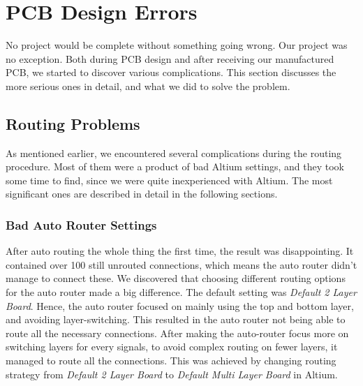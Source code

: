 \section{PCB Design Errors}
No project would be complete without something going wrong. Our project was no exception. Both during PCB design and after receiving our manufactured PCB, we started to discover various complications. This section discusses the more serious ones in detail, and what we did to solve the problem.

\subsection{Routing Problems}
\label{Routing Problems}
As mentioned earlier, we encountered several complications during the routing procedure. Most of them were a product of bad Altium settings, and they took some time to find, since we were quite inexperienced with Altium.
The most significant ones are described in detail in the following sections.

\subsubsection{Bad Auto Router Settings}
After auto routing the whole thing the first time, the result was disappointing. It contained over 100 still unrouted connections, which means the auto router didn't manage to connect these.
\newline
\newline
We discovered that choosing different routing options for the auto router made a big difference. The default setting was \emph{Default 2 Layer Board}. Hence, the auto router focused on mainly using the top and bottom layer, and avoiding layer-switching. This resulted in the auto router not being able to route all the necessary connections.
\newline
\newline
After making the auto-router focus more on switching layers for every signals, to avoid complex routing on fewer layers, it managed to route all the connections. This was achieved by changing routing strategy from \emph{Default 2 Layer Board} to \emph{Default Multi Layer Board} in Altium.

